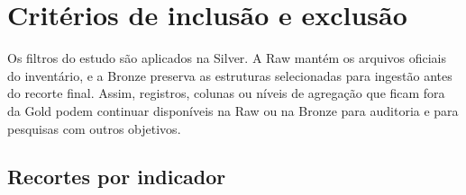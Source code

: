 \chapter{Critérios de inclusão e exclusão}
\label{ap:criterios}
\setlength{\tabcolsep}{2pt}
\setlength{\emergencystretch}{3em}

Os filtros do estudo são aplicados na Silver. A Raw mantém os arquivos oficiais do inventário, e a Bronze preserva as estruturas selecionadas para ingestão antes do recorte final. Assim, registros, colunas ou níveis de agregação que ficam fora da Gold podem continuar disponíveis na Raw ou na Bronze para auditoria e para pesquisas com outros objetivos.

\section{Recortes por indicador}

